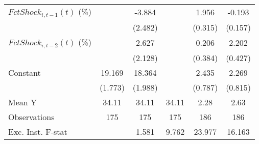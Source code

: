 {\begin{tabular}{l*{5}{c}}
\addlinespace
$ FctShock_{i,t-1}(t)$ (\%)&                     &      -3.884         &                     &       1.956\sym{***}&      -0.193         \\
                    &                     &     (2.482)         &                     &     (0.315)         &     (0.157)         \\
\addlinespace
$ FctShock_{i,t-2}(t)$ (\%)&                     &       2.627         &                     &       0.206         &       2.202\sym{***}\\
                    &                     &     (2.128)         &                     &     (0.384)         &     (0.427)         \\
\addlinespace
Constant            &      19.169\sym{***}&      18.364\sym{***}&                     &       2.435\sym{**} &       2.269\sym{**} \\
                    &     (1.773)         &     (1.988)         &                     &     (0.787)         &     (0.815)         \\
\midrule
Mean Y              &       34.11         &       34.11         &       34.11         &        2.28         &        2.63         \\
Observations        &         175         &         175         &         175         &         186         &         186         \\
Exc. Inst. F-stat   &                     &       1.581         &       9.762         &      23.977         &      16.163         \\
\bottomrule
\end{tabular}
}
